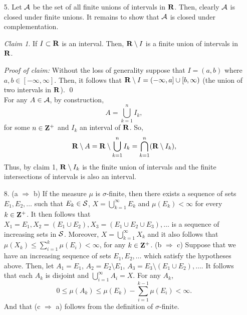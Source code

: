 \documentclass{article}
\theoremstyle{remark}
\newtheorem{claim}{Claim}
\newenvironment{poc}{\textit{Proof of claim:}}{\qed\\}
\begin{document}
\begin{enumerate}[leftmargin=*]
   
   \item[5.] Let $\mathcal{A}$ be the set of all finite unions of intervals in $\mathbf{R}$. Then, clearly $\mathcal{A}$ is closed under finite unions. It remains to show that $\mathcal{A}$ is closed under complementation.
   \begin{claim}
       If $I \subset \mathbf{R}$ is an interval. Then, $\mathbf{R} \setminus I$ is a finite union of intervals in $\mathbf{R}$. 
   \end{claim}
   \begin{poc}
       Without the loss of generality suppose that $I = (a,b)$ where $a,b \in [-\infty,\infty]$. Then, it follows that $\mathbf{R} \setminus I = (-\infty,a] \cup [b,\infty)$ (the union of two intervals in $\mathbf{R}$).
   \end{poc}
   For any $A \in \mathcal{A}$, by construction, 
   \[
        A = \bigcup_{k=1}^n I_k,
   \]
   for some $n\in\mathbf{Z}^+$ and $I_k$ an interval of $\mathbf{R}$. So,
   \[
        \mathbf{R} \setminus A = \mathbf{R} \setminus \bigcup_{k=1}^n I_k = \bigcap_{k=1}^n (\mathbf{R} \setminus I_k),
   \]
   Thus, by claim 1, $\mathbf{R} \setminus I_k$ is the finite union of intervals and the finite intersections of
   intervals is also an interval.
   
   \item[8.] (a $\Rightarrow$ b) If the measure $\mu$ is $\sigma$-finite, then there exists a sequence of sets $E_1,E_2,\ldots$ such that $E_k \in \mathcal{S}$, $X = \bigcup_{k=1}^\infty E_k$ and $\mu(E_k) < \infty$ for every $k\in\mathbf{Z}^+$. It then follows that $X_1 = E_1, X_2 = (E_1 \cup E_2), X_3 = (E_1 \cup E_2 \cup E_3), \ldots$ is a sequence of increasing sets in $\mathcal{S}$. Moreover, $X = \bigcup_{k=1}^\infty X_k$ and it also follows that $\mu(X_k) \leq \sum_{i=1}^k \mu(E_i) < \infty$, for any $k\in\mathbf{Z}^+$. (b $\Rightarrow$ c) Suppose that we have an increasing sequence of sets $E_1, E_2, \ldots$ which satisfy the hypotheses above. Then, let $A_1 = E_1$, $A_2 = E_2 \setminus E_1$, $A_3 = E_3 \setminus (E_1 \cup E_2), \ldots$. It follows that each $A_k$ is disjoint and $\bigcup_{i=1}^\infty A_i = X$. For any $A_k$,
   \[
    0 \leq \mu(A_k) \leq \mu(E_k) - \sum_{i=1}^{k-1} \mu(E_i) < \infty.
   \]
   And that (c $\Rightarrow$ a) follows from the definition of $\sigma$-finite.
   

\end{enumerate}
\end{document}
